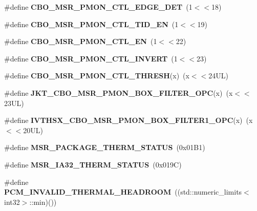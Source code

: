 \begin{DoxyCompactItemize}
\item 
\#define {\bfseries C\+B\+O\+\_\+\+M\+S\+R\+\_\+\+P\+M\+O\+N\+\_\+\+C\+T\+L\+\_\+\+E\+D\+G\+E\+\_\+\+D\+ET}~(1$<$$<$18)\label{types_8h_aa1e7dd3fb15ea04620a9d20a68b283a3}

\item 
\#define {\bfseries C\+B\+O\+\_\+\+M\+S\+R\+\_\+\+P\+M\+O\+N\+\_\+\+C\+T\+L\+\_\+\+T\+I\+D\+\_\+\+EN}~(1$<$$<$19)\label{types_8h_ac8a367544d2f6c270199a2dad381c10a}

\item 
\#define {\bfseries C\+B\+O\+\_\+\+M\+S\+R\+\_\+\+P\+M\+O\+N\+\_\+\+C\+T\+L\+\_\+\+EN}~(1$<$$<$22)\label{types_8h_a624d2a2eee41bf4f9ed3b7e50ed7de9d}

\item 
\#define {\bfseries C\+B\+O\+\_\+\+M\+S\+R\+\_\+\+P\+M\+O\+N\+\_\+\+C\+T\+L\+\_\+\+I\+N\+V\+E\+RT}~(1$<$$<$23)\label{types_8h_ae080b2e88b364739256198f9fc6ef8f4}

\item 
\#define {\bfseries C\+B\+O\+\_\+\+M\+S\+R\+\_\+\+P\+M\+O\+N\+\_\+\+C\+T\+L\+\_\+\+T\+H\+R\+E\+SH}(x)~(x$<$$<$24\+U\+L)\label{types_8h_aedec93a7fe3b48c66ae3c5d49232aef1}

\item 
\#define {\bfseries J\+K\+T\+\_\+\+C\+B\+O\+\_\+\+M\+S\+R\+\_\+\+P\+M\+O\+N\+\_\+\+B\+O\+X\+\_\+\+F\+I\+L\+T\+E\+R\+\_\+\+O\+PC}(x)~(x$<$$<$23\+U\+L)\label{types_8h_a72146a3beff41b1742b661879850a483}

\item 
\#define {\bfseries I\+V\+T\+H\+S\+X\+\_\+\+C\+B\+O\+\_\+\+M\+S\+R\+\_\+\+P\+M\+O\+N\+\_\+\+B\+O\+X\+\_\+\+F\+I\+L\+T\+E\+R1\+\_\+\+O\+PC}(x)~(x$<$$<$20\+U\+L)\label{types_8h_a3a2aaf9fb5d886edcdb6ffc9194eed74}

\item 
\#define {\bfseries M\+S\+R\+\_\+\+P\+A\+C\+K\+A\+G\+E\+\_\+\+T\+H\+E\+R\+M\+\_\+\+S\+T\+A\+T\+US}~(0x01\+B1)\label{types_8h_a4d40c003f2608f118c644465406aed3b}

\item 
\#define {\bfseries M\+S\+R\+\_\+\+I\+A32\+\_\+\+T\+H\+E\+R\+M\+\_\+\+S\+T\+A\+T\+US}~(0x019\+C)\label{types_8h_a3940bd7e7cc81fd9476152b71e29ea7b}

\item 
\#define {\bfseries P\+C\+M\+\_\+\+I\+N\+V\+A\+L\+I\+D\+\_\+\+T\+H\+E\+R\+M\+A\+L\+\_\+\+H\+E\+A\+D\+R\+O\+OM}~((std\+::numeric\+\_\+limits$<$int32$>$\+::min)())\label{types_8h_a2f51296747d63852b05ea0afab0b700e}


\end{DoxyCompactItemize}
